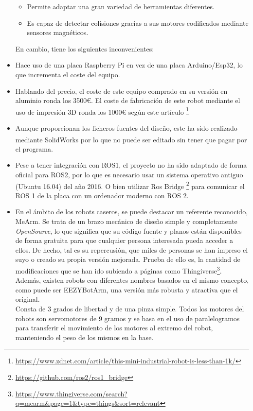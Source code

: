 \begin{itemize}
\begin{itemize}
    \item Permite adaptar una gran variedad de herramientas diferentes.
    \item Es capaz de detectar colisiones gracias a sus motores codificados mediante sensores magnéticos.
    \end{itemize}
    En cambio, tiene los siguientes inconvenientes:
    \item Hace uso de una placa Raspberry Pi en vez de una placa Arduino/Esp32, lo que incrementa el coste del equipo. 
    \item Hablando del precio, el coste de este equipo comprado en su versión en aluminio ronda los 3500\euro. El coste de fabricación 
    de este robot mediante el uso de impresión 3D ronda los 1000\euro \xspace según este artículo \footnote{\url{https://www.zdnet.com/article/this-mini-industrial-robot-is-less-than-1k/}}
    \item Aunque proporcionan los ficheros fuentes del diseño, este ha sido realizado mediante SolidWorks\textsuperscript{\tiny\textregistered} por 
    lo que no puede ser editado sin tener que pagar por el programa.
    \item Pese a tener integración con ROS1, el proyecto no ha sido adaptado de forma oficial para ROS2, por lo que es necesario 
    usar un sistema operativo antiguo (Ubuntu 16.04) del año 2016. O bien utilizar Ros Bridge \footnote{\url{https://github.com/ros2/ros1\_bridge}} 
    para comunicar el ROS 1 de la placa con un  ordenador moderno con ROS 2.
   
    \newpage
    \item En el ámbito de los robots caseros, se puede destacar un referente reconocido, MeArm. Se trata de un 
    brazo mecánico de diseño simple y completamente \textit{OpenSource}, lo que significa que su código fuente y planos están disponibles 
    de forma gratuita para que cualquier persona interesada pueda acceder a ellos. De hecho, tal es su repercusión, que miles de personas 
    se han impreso el suyo o creado su propia versión mejorada. Prueba de ello es, la cantidad de modificaciones que se han ido subiendo a  
    páginas como Thingiverse\footnote{\url{https://www.thingiverse.com/search?q=mearm&page=1&type=things&sort=relevant}}. Además, existen 
    robots con diferentes nombres basados en el mismo concepto, como puede ser EEZYBotArm, una versión más robusta y atractiva que el original. \\
    Consta de 3 grados de libertad y de una pinza simple. Todos los motores del robots son servomotores de 9 gramos y se basa en el uso de 
    paralelogramos para transferir el movimiento de los motores al extremo del robot, manteniendo el peso de los mismos en la base. 


\end{itemize}
